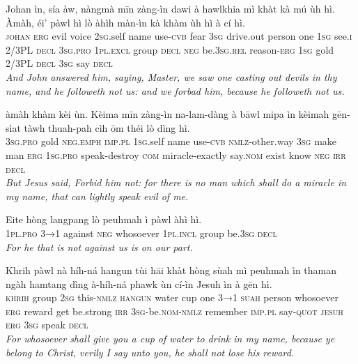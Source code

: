 \documentclass[11pt,a4paper]{article}
\begin{document}
\begin{exe}
\gll Johan ìn, sía àw, nàngmà mīn zàng-ìn dawi à hawlkhia mì khàt kà mú ùh hì. Àmàh, éi' pàwl hì lò àhìh màn-ìn kà khàm ùh hì à cí hì. \\
     \textsc{johan} \textsc{erg} evil voice \textsc{2sg}.self name use-\textsc{cvb} fear \textsc{3sg} drive.out person one \textsc{1sg} see.\textsc{i} 2/3PL \textsc{decl} \textsc{3sg}.\textsc{pro} \textsc{1pl}.\textsc{excl} group \textsc{decl} \textsc{neg} be.\textsc{3sg}.\textsc{rel} reason-\textsc{erg} \textsc{1sg} gold 2/3PL \textsc{decl} \textsc{3sg} say \textsc{decl} \\
\glt \textcolor{kjvcolor}{\textit{And John answered him, saying, Master, we saw one casting out devils in thy name, and he followeth not us: and we forbad him, because he followeth not us.}}

\gll àmàh khàm kèi ùn. Kèima mīn zàng-ìn na-lam-dàng à bāwl mipa ìn kèimah gēn-sìat tàwh thuah-pah cìh ōm théi lò dìng hì. \\
     \textsc{3sg}.\textsc{pro} gold \textsc{neg}.\textsc{emph} \textsc{imp}.\textsc{pl} \textsc{1sg}.self name use-\textsc{cvb} \textsc{nmlz}-other.way \textsc{3sg} make man \textsc{erg} \textsc{1sg}.\textsc{pro} speak-destroy \textsc{com} miracle-exactly say.\textsc{nom} exist know \textsc{neg} \textsc{irr} \textsc{decl} \\
\glt \textcolor{kjvcolor}{\textit{But Jesus said, Forbid him not: for there is no man which shall do a miracle in my name, that can lightly speak evil of me.}}

\gll Eite hòng langpang lò peuhmah ì pàwl àhì hì. \\
     \textsc{1pl}.\textsc{pro} \textsc{3→1} against \textsc{neg} whosoever \textsc{1pl}.\textsc{incl} group be.\textsc{3sg} \textsc{decl} \\
\glt \textcolor{kjvcolor}{\textit{For he that is not against us is on our part.}}

\gll Khrih pàwl nà híh-ná hangun tùi hāi khàt hòng sùah mì peuhmah ìn thaman ngàh hamtang dìng à-híh-ná phawk ùn cí-ìn Jesuh ìn à gēn hì. \\
     \textsc{khrih} group \textsc{2sg} this-\textsc{nmlz} \textsc{hangun} water cup one \textsc{3→1} \textsc{suah} person whosoever \textsc{erg} reward get be.strong \textsc{irr} \textsc{3sg}-be.\textsc{nom}-\textsc{nmlz} remember \textsc{imp}.\textsc{pl} say-\textsc{quot} \textsc{jesuh} \textsc{erg} \textsc{3sg} speak \textsc{decl} \\
\glt \textcolor{kjvcolor}{\textit{For whosoever shall give you a cup of water to drink in my name, because ye belong to Christ, verily I say unto you, he shall not lose his reward.}}


\end{exe}
\end{document}
